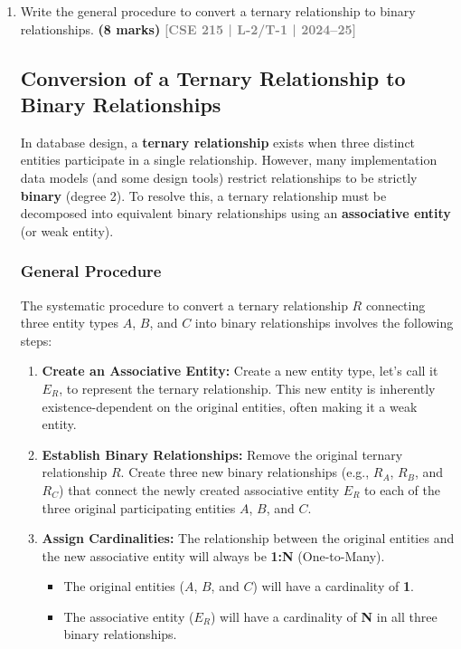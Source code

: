 \documentclass[12pt,a3paper]{article}
\newcommand{\yr}[1]{\hfill\textcolor{gray}{\small\textbf{[#1]}}}
\newcommand{\mk}[1]{\textcolor{orange!70!black}{\small\textbf{(#1 marks)}}}
\begin{document}
\begin{enumerate}

\item Write the general procedure to convert a ternary relationship to binary relationships.
\mk{8} \yr{CSE 215 | L-2/T-1 | 2024--25}

\begin{tcolorbox}[enhanced,breakable,ansbox,colback=cA!4,colframe=cA,boxrule=0.8pt,arc=5pt,title={\textbf{Answer}},fonttitle=\bfseries\color{white},colbacktitle=cA]

\subsection*{Conversion of a Ternary Relationship to Binary Relationships}

In database design, a \textbf{ternary relationship} exists when three distinct entities participate in a single relationship. However, many implementation data models (and some design tools) restrict relationships to be strictly \textbf{binary} (degree 2). To resolve this, a ternary relationship must be decomposed into equivalent binary relationships using an \textbf{associative entity} (or weak entity).

\subsubsection*{General Procedure}

The systematic procedure to convert a ternary relationship $R$ connecting three entity types $A$, $B$, and $C$ into binary relationships involves the following steps:

\begin{enumerate}
    \item \textbf{Create an Associative Entity:} 
    Create a new entity type, let's call it $E_R$, to represent the ternary relationship. This new entity is inherently existence-dependent on the original entities, often making it a weak entity.
    
    \item \textbf{Establish Binary Relationships:} 
    Remove the original ternary relationship $R$. Create three new binary relationships (e.g., $R_A$, $R_B$, and $R_C$) that connect the newly created associative entity $E_R$ to each of the three original participating entities $A$, $B$, and $C$.
    
    \item \textbf{Assign Cardinalities:} 
    The relationship between the original entities and the new associative entity will always be \textbf{1:N} (One-to-Many). 
    \begin{itemize}
        \item The original entities ($A$, $B$, and $C$) will have a cardinality of \textbf{1}.
        \item The associative entity ($E_R$) will have a cardinality of \textbf{N} in all three binary relationships.
    \end{itemize}
    

\end{enumerate}
\end{tcolorbox}
\end{enumerate}
\end{document}
